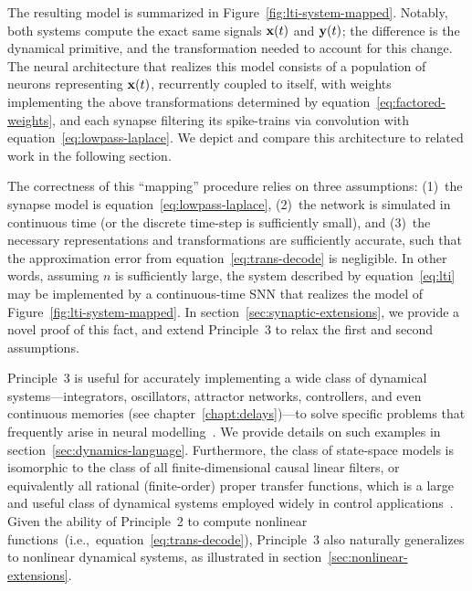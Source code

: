 The resulting model is summarized in Figure~\ref{fig:lti-system-mapped}.
Notably, both systems compute the exact same signals $\mathbf{x}(t)$ and $\mathbf{y}(t)$; the difference is the dynamical primitive, and the transformation needed to account for this change.
The neural architecture that realizes this model consists of a population of neurons representing $\mathbf{x}(t)$, recurrently coupled to itself, with weights implementing the above transformations determined by equation~\ref{eq:factored-weights}, and each synapse filtering its spike-trains via convolution with equation~\ref{eq:lowpass-laplace}.
We depict and compare this architecture to related work in the following section.

The correctness of this ``mapping'' procedure relies on three assumptions: (1)~the synapse model is equation~\ref{eq:lowpass-laplace}, (2)~the network is simulated in continuous time (or the discrete time-step is sufficiently small), and (3)~the necessary representations and transformations are sufficiently accurate, such that the approximation error from equation~\ref{eq:trans-decode} is negligible.
In other words, assuming $n$ is sufficiently large, the system described by equation~\ref{eq:lti} may be implemented by a continuous-time SNN that realizes the model of Figure~\ref{fig:lti-system-mapped}.
In section~\ref{sec:synaptic-extensions}, we provide a novel proof of this fact, and extend Principle~3 to relax the first and second assumptions.

Principle~3 is useful for accurately implementing a wide class of dynamical systems---integrators, oscillators, attractor networks, controllers, and even continuous memories (see chapter~\ref{chapt:delays})---to solve specific problems that frequently arise in neural modelling~\citep[e.g.,][]{eliasmith2000b, singh2004, eliasmith2005b, singh2006}.
We provide details on such examples in section~\ref{sec:dynamics-language}.
Furthermore, the class of state-space models is isomorphic to the class of all finite-dimensional causal linear filters, or equivalently all rational (finite-order) proper transfer functions, which is a large and useful class of dynamical systems employed widely in control applications~\citep{brogan1982modern}.
Given the ability of Principle~2 to compute nonlinear functions~(i.e.,~equation~\ref{eq:trans-decode}), Principle~3 also naturally generalizes to nonlinear dynamical systems, as illustrated in section~\ref{sec:nonlinear-extensions}.

